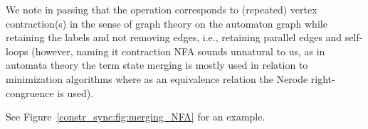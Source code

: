 We note in passing that the operation corresponds to (repeated) vertex contraction(s)
in the sense of graph theory on the automaton graph while retaining
the labels and not removing  edges, i.e., retaining parallel edges
and self-loops (however, naming it contraction NFA sounds unnatural to us, as in automata theory the term state merging is mostly used in relation to minimization algorithms where
as an equivalence relation the Nerode right-congruence is used).

%
% 
%

See Figure~\ref{constr_sync:fig:merging_NFA} for an example.

